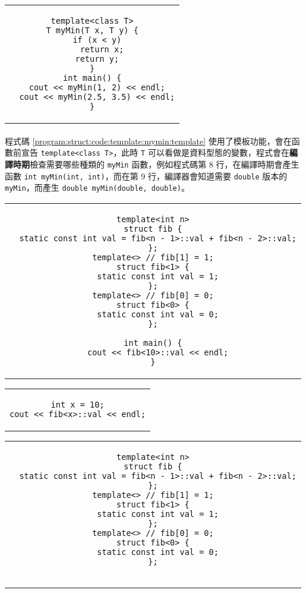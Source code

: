 \documentclass[12pt,a4paper,oneside]{report}
\begin{document}
\begin{CJK}{UTF8}{bkai}
\begin{code}[h!]
\centering
\begin{tabular}{c}
\begin{lstlisting}
template<class T>
T myMin(T x, T y) {
  if (x < y)
    return x;
  return y;
}
int main() {
  cout << myMin(1, 2) << endl;
  cout << myMin(2.5, 3.5) << endl;
}
\end{lstlisting}
\end{tabular}
\caption{使用 \lstinline!template! 的 \lstinline!myMin! 函數}
\label{program:struct:code:template:mymin:template}
\end{code}

\paragraph{}程式碼 \ref{program:struct:code:template:mymin:template} 使用了模板功能，會在函數前宣告 \lstinline!template<class T>!，此時 \lstinline!T! 可以看做是資料型態的變數，程式會在{\color{red}\textbf{編譯時期}}檢查需要哪些種類的 \lstinline!myMin! 函數，例如程式碼第 8 行，在編譯時期會產生函數 \lstinline!int myMin(int, int)!，而在第 9 行，編譯器會知道需要 \lstinline!double! 版本的 \lstinline!myMin!，而產生 \lstinline!double myMin(double, double)!。

\begin{code}[h!]
\centering
\begin{tabular}{c}
\begin{lstlisting}
template<int n>
struct fib {
  static const int val = fib<n - 1>::val + fib<n - 2>::val;
};
template<> // fib[1] = 1;
struct fib<1> {
  static const int val = 1;
};
template<> // fib[0] = 0;
struct fib<0> {
  static const int val = 0;
};

int main() {
  cout << fib<10>::val << endl;
}
\end{lstlisting}
\end{tabular}
\end{code}

\begin{code}
\centering
\begin{tabular}{c}
\begin{lstlisting}
int x = 10;
cout << fib<x>::val << endl;
\end{lstlisting}
\end{tabular}
\end{code}

\begin{code}[h!]
\centering
\begin{tabular}{c}
\begin{lstlisting}
template<int n>
struct fib {
  static const int val = fib<n - 1>::val + fib<n - 2>::val;
};
template<> // fib[1] = 1;
struct fib<1> {
  static const int val = 1;
};
template<> // fib[0] = 0;
struct fib<0> {
  static const int val = 0;
};


\end{lstlisting}
\end{tabular}
\end{code}
\end{CJK}
\end{document}

